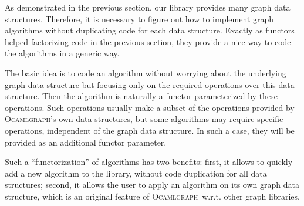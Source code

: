 \documentclass[]{tfp05symp}
\newcommand{\ocamlgraph}{\textsc{Ocamlgraph}\xspace}
\begin{document}
As demonstrated in the previous section, our library provides many
graph data structures. Therefore, it is necessary to figure out how to
implement graph algorithms without duplicating code for each data
structure. Exactly as functors helped factorizing code in the previous
section, they provide a nice way to code the algorithms in a generic
way.

The basic idea is to code an algorithm without worrying about the
underlying graph data structure but focusing only on the required
operations over this data structure. Then the algorithm is naturally a
functor parameterized by these operations. Such operations usually
make a subset of the operations provided by \ocamlgraph's own data
structures, but some algorithms may require specific operations,
independent of the graph data structure. In such a case, they will be
provided as an additional functor parameter.

Such a ``functorization'' of algorithms has two benefits: first, it
allows to quickly add a new algorithm to the library, without code
duplication for all data structures; second, it allows the user to
apply an algorithm on its own graph data structure, which is an
original feature of \ocamlgraph\ w.r.t. other graph libraries.
\end{document}
